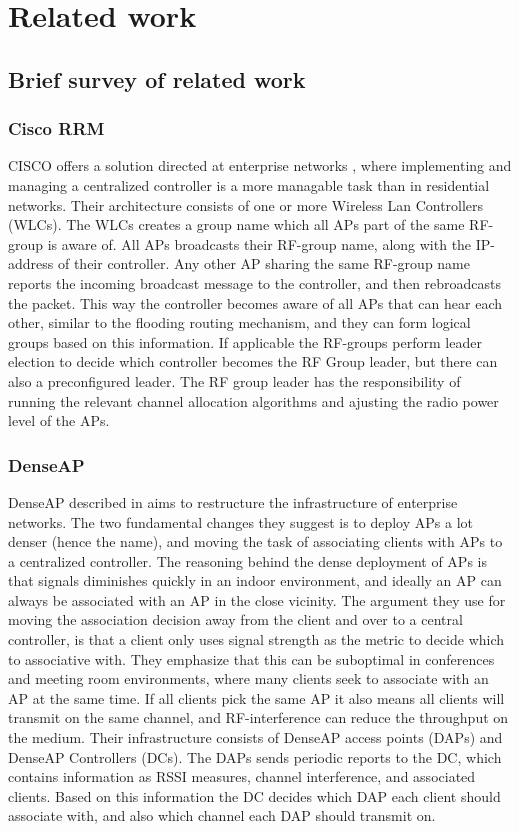 \chapter{Related work}

\section{Brief survey of related work}
\subsection{Cisco RRM}
CISCO offers a solution directed at enterprise networks \cite{ciscoRRM}, where implementing and managing a centralized
controller is a more managable task than in residential networks.
Their architecture consists of one or more Wireless Lan Controllers (WLCs).
The WLCs creates a group name which all APs part of the same RF-group is aware of. All APs broadcasts their RF-group name, along
with the IP-address of their controller. Any other AP sharing the same RF-group name reports the incoming broadcast message to the controller, and then rebroadcasts the packet.  This way the controller
becomes aware of all APs that can hear each other, similar to the flooding routing mechanism,
and they can form logical groups based on this information.
If applicable the RF-groups perform leader election to decide which controller becomes the RF Group leader, but there
can also a preconfigured leader. The RF group leader has the responsibility of running the relevant channel allocation
algorithms and ajusting the radio power level of the APs. 

\subsection{DenseAP}
DenseAP described in \cite{Murty2} aims to restructure the infrastructure of enterprise networks.  The two fundamental
changes they suggest is to deploy APs a lot denser (hence the name), and moving the task of associating clients
with APs to a centralized controller. The reasoning behind the dense deployment of APs is that signals diminishes
quickly in an indoor environment, and ideally an AP can always be associated with an AP in the close vicinity. The argument 
they use for moving the association decision away from the client and over to a central controller, is that a client
only uses signal strength as the metric to decide which to associative with. They emphasize that this can be
suboptimal in conferences and meeting room environments, where many clients seek to associate with an AP at the same time.
If all clients pick the same AP it also means all clients will transmit on the same channel,
and RF-interference can reduce the throughput on the medium. 
Their infrastructure consists of DenseAP access points (DAPs) and DenseAP Controllers (DCs). The DAPs sends periodic
reports to the DC, which contains information as RSSI measures, channel interference, and associated clients. Based on this
information the DC decides which DAP each client should associate with, and also which channel each DAP should transmit
on. 


